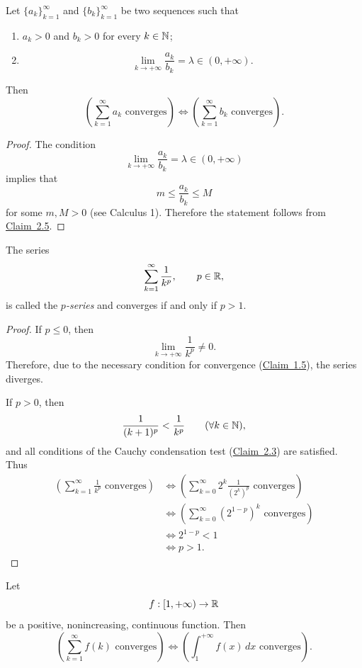 \begin{claim}\label{claim:2.6}
Let $\{a_k\}_{k=1}^{\infty}$ and $\{b_k\}_{k=1}^{\infty}$ be two sequences such that
\begin{enumerate}[label=\alph*)]
\item\label{item:claim:2.6:a} $a_k>0$ and $b_k>0$ for every $k\in\mathbb{N}$;
\item\label{item:claim:2.6:b}
\[
\lim_{k\to+\infty}\frac{a_k}{b_k}=\lambda\in(0,+\infty).
\]
\end{enumerate}
Then
\[
\left(\sum_{k=1}^{\infty}a_k\text{ converges}\right)
\iff
\left(\sum_{k=1}^{\infty}b_k\text{ converges}\right).
\]
\end{claim}

\begin{proof}
The condition
\[
\lim_{k\to+\infty}\frac{a_k}{b_k}=\lambda\in(0,+\infty)
\]
implies that
\[
m\le\frac{a_k}{b_k}\le M
\]
for some $m,M>0$ (see Calculus 1). Therefore the statement follows from \hyperref[claim:2.5]{Claim~2.5}.
\end{proof}

\begin{claim}\label{claim:2.7}
The series
\[
\sum_{k=1}^{\infty}\frac1{k^p},
\qquad p\in\mathbb{R},
\]
is called the \emph{$p$-series} and converges if and only if $p>1$.
\end{claim}

\begin{proof}
If $p\le0$, then
\[
\lim_{k\to+\infty}\frac1{k^p}\ne0.
\]
Therefore, due to the necessary condition for convergence (\hyperref[claim:1.5]{Claim~1.5}), the series diverges.

If $p>0$, then
\[
\frac1{(k+1)^p}<\frac1{k^p}\qquad(\forall k\in\mathbb{N}),
\]
and all conditions of the Cauchy condensation test (\hyperref[claim:2.3]{Claim~2.3}) are satisfied. Thus
\begin{align*}
\left(\sum_{k=1}^{\infty}\frac1{k^p}\text{ converges}\right)
&\iff
\left(\sum_{k=0}^{\infty}2^k\frac1{(2^k)^p}\text{ converges}\right)\\
&\iff
\left(\sum_{k=0}^{\infty}\left(2^{1-p}\right)^k\text{ converges}\right)\\
&\iff 2^{1-p}<1\\
&\iff p>1.
\end{align*}
\end{proof}

\begin{claim}\label{claim:2.8}
Let
\[
f:[1,+\infty)\to\mathbb{R}
\]
be a positive, nonincreasing, continuous function. Then
\[
\left(\sum_{k=1}^{\infty}f(k)\text{ converges}\right)
\iff
\left(\int_1^{+\infty}f(x)\,dx\text{ converges}\right).
\]
\end{claim}

